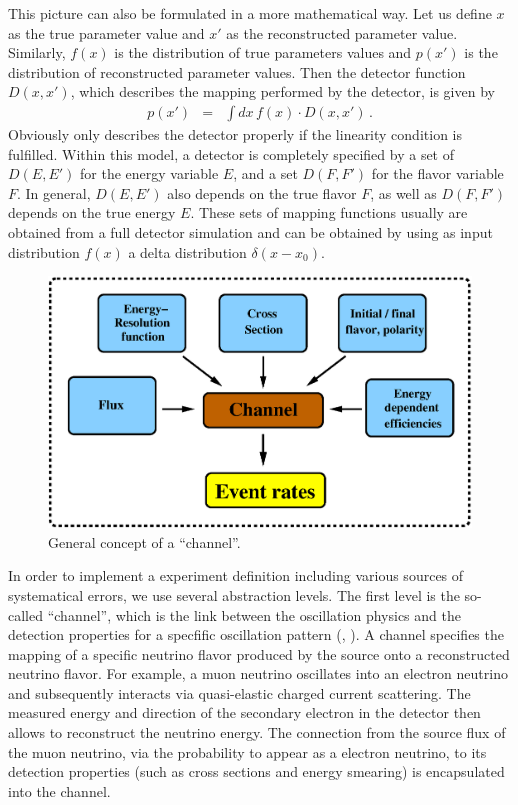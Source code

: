 This picture can also be formulated in a more mathematical way. Let us define $x$ as the true parameter value and $x'$ as the reconstructed parameter value. Similarly, $f(x)$ is the distribution of true parameters values and $p(x')$ is the distribution of reconstructed parameter values. Then the detector function  $D(x,x')$, which describes the mapping performed by the detector, is given by
\begin{eqnarray}
\label{equ:mapping}
p(x')&=&\int dx\, f(x)\cdot D(x,x')\,.
\end{eqnarray}
Obviously  only describes the detector properly
if the linearity condition is fulfilled. Within this model, a detector
is completely specified by a set of $D(E,E')$ for the energy variable $E$,
and a set $D(F,F')$ for the flavor variable $F$. In general, $D(E,E')$ also depends on the true flavor $F$, as well as $D(F,F')$ depends on the true energy $E$. These sets of mapping functions usually are obtained from a 
full detector simulation and can be obtained by using as input 
distribution $f(x)$ a delta distribution $\delta(x-x_0)$.

\begin{figure}[t]
\begin{center}
\includegraphics[width=13cm]{AEDL1}
\end{center}
\caption{\label{fig:channel} General concept of a ``channel''.}
\end{figure}

In order to implement a experiment definition including various
sources of systematical errors, we use several abstraction levels. 
The first level is the so-called ``channel'', which is the link between 
the oscillation physics and the detection properties for a specfific oscillation pattern (\cf, ). A channel specifies the mapping of a specific neutrino flavor produced by the source onto a reconstructed neutrino flavor.
For example, a muon neutrino oscillates into an electron neutrino and subsequently interacts via quasi-elastic charged current scattering. The measured energy and direction of
the secondary electron in the detector then allows to reconstruct the neutrino energy. The connection from the source flux of the muon neutrino, via the  probability to appear as a electron neutrino, to its detection properties (such as cross sections and energy smearing) is encapsulated into the channel.

